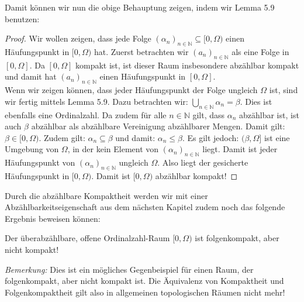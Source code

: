 \documentclass[11pt]{scrartcl}
\begin{document}
\noindent Damit können wir nun die obige Behauptung zeigen, indem wir Lemma 5.9 benutzen:
\begin{proof}
	Wir wollen zeigen, dass jede Folge $(\alpha_n)_{n\in\mathbb N} \subseteq [0,\Omega)$ einen 
	Häufungspunkt in $[0,\Omega)$ hat. Zuerst betrachten wir $(a_n)_{n\in\mathbb N}$ als eine Folge
	in $[0,\Omega]$. Da $[0,\Omega]$ kompakt ist, ist dieser Raum insbesondere abzählbar kompakt und
	damit hat $(a_n)_{n\in\mathbb N}$ einen Häufungspunkt in $[0,\Omega]$.\\
	Wenn wir zeigen können, dass jeder Häufungspunkt der Folge ungleich $\Omega$ ist, sind wir
	fertig mittels Lemma 5.9. Dazu betrachten wir: $\bigcup_{n\in\mathbb N} \alpha_n = \beta$. Dies
	ist ebenfalls eine Ordinalzahl. Da zudem für alle $n\in\mathbb N$ gilt, dass $\alpha_n$ 
	abzählbar ist, ist auch $\beta$ abzählbar als abzählbare Vereinigung abzählbarer Mengen. Damit 
	gilt: $\beta \in [0, \Omega)$. Zudem gilt: $\alpha_n \subseteq \beta$ und damit: $\alpha_n\leq 
	\beta$. Es gilt jedoch: $(\beta,\Omega]$ ist eine Umgebung von $\Omega$, in der kein Element von 
	$(\alpha_n)_{n\in\mathbb N}$ liegt. Damit ist jeder Häufungspunkt von $(\alpha_n)_{n\in\mathbb N}
	$ ungleich $\Omega$. Also liegt der gesicherte Häufungspunkt in $[0,\Omega)$. Damit ist
	$[0,\Omega)$ abzählbar kompakt!
\end{proof}
\noindent Durch die abzählbare Kompaktheit werden wir mit einer Abzählbarkeitseigenschaft aus dem nächsten Kapitel zudem noch das folgende Ergebnis beweisen können:
\begin{theorem}
	Der überabzählbare, offene Ordinalzahl-Raum $[0,\Omega)$ ist folgenkompakt, aber nicht kompakt!
\end{theorem}
\textit{Bemerkung:} Dies ist ein mögliches Gegenbeispiel für einen Raum, der folgenkompakt, aber nicht kompakt ist. Die Äquivalenz von Kompaktheit und Folgenkompaktheit gilt also in allgemeinen topologischen Räumen nicht mehr!
\end{document}
